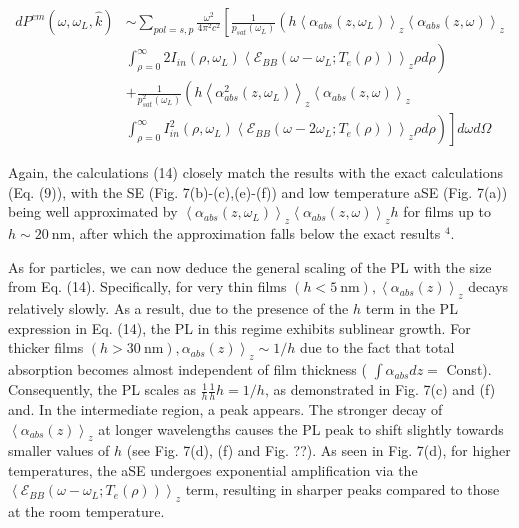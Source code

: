 \documentclass[10pt]{article}
\begin{document}
\begin{align*}
d P^{e m}\left(\omega, \omega_{L}, \hat{k}\right) & \sim \sum_{p o l=s, p} \frac{\omega^{2}}{4 \pi^{2} c^{2}}\left[\frac { 1 } { p _ { s a t } ( \omega _ { L } ) } \left(h\left\langle\alpha_{a b s}\left(z, \omega_{L}\right)\right\rangle_{z}\left\langle\alpha_{a b s}(z, \omega)\right\rangle_{z}\right.\right. \\
& \left.\int_{\rho=0}^{\infty} 2 I_{i n}\left(\rho, \omega_{L}\right)\left\langle\mathcal{E}_{B B}\left(\omega-\omega_{L} ; T_{e}(\rho)\right)\right\rangle_{z} \rho d \rho\right)  \tag{14}\\
& +\frac{1}{p_{s a t}^{2}\left(\omega_{L}\right)}\left(h\left\langle\alpha_{a b s}^{2}\left(z, \omega_{L}\right)\right\rangle_{z}\left\langle\alpha_{a b s}(z, \omega)\right\rangle_{z}\right. \\
& \left.\left.\int_{\rho=0}^{\infty} I_{i n}^{2}\left(\rho, \omega_{L}\right)\left\langle\mathcal{E}_{B B}\left(\omega-2 \omega_{L} ; T_{e}(\rho)\right)\right\rangle_{z} \rho d \rho\right)\right] d \omega d \Omega
\end{align*}


Again, the calculations (14) closely match the results with the exact calculations (Eq. (9)), with the SE (Fig. 7(b)-(c),(e)-(f)) and low temperature aSE (Fig. 7(a)) being well approximated by $\left\langle\alpha_{a b s}\left(z, \omega_{L}\right)\right\rangle_{z}\left\langle\alpha_{a b s}(z, \omega)\right\rangle_{z} h$ for films up to $h \sim 20 \mathrm{~nm}$, after which the approximation falls below the exact results ${ }^{4}$.

As for particles, we can now deduce the general scaling of the PL with the size from Eq. (14). Specifically, for very thin films $(h<5 \mathrm{~nm}),\left\langle\alpha_{a b s}(z)\right\rangle_{z}$ decays relatively slowly. As a result, due to the presence of the $h$ term in the PL expression in Eq. (14), the PL in this regime exhibits sublinear growth. For thicker films $\left.(h>30 \mathrm{~nm}), \alpha_{a b s}(z)\right\rangle_{z} \sim 1 / h$ due to the fact that total absorption becomes almost independent of film thickness ( $\int \alpha_{a b s} d z=$ Const). Consequently, the PL scales as $\frac{1}{h} \frac{1}{h} h=1 / h$, as demonstrated in Fig. 7(c) and (f) and. In the intermediate region, a peak appears. The stronger decay of $\left\langle\alpha_{a b s}(z)\right\rangle_{z}$ at longer wavelengths causes the PL peak to shift slightly towards smaller values of $h$ (see Fig. 7(d), (f) and Fig. ??). As seen in Fig. 7(d), for higher temperatures, the aSE undergoes exponential amplification via the $\left\langle\mathcal{E}_{B B}\left(\omega-\omega_{L} ; T_{e}(\rho)\right)\right\rangle_{z}$ term, resulting in sharper peaks compared to those at the room temperature.
\end{document}
